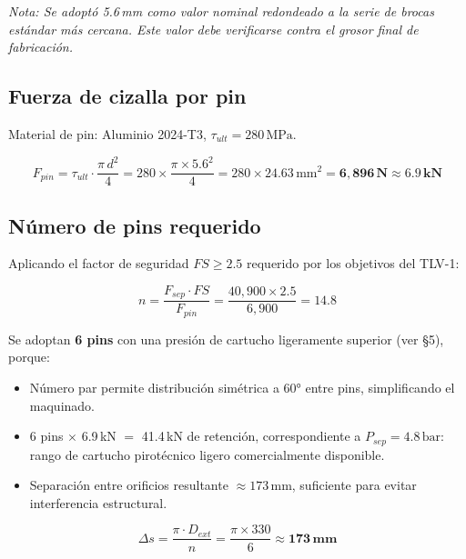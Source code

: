 \documentclass[11pt, a4paper]{article}
\begin{document}
\textit{Nota: Se adoptó 5.6\,mm como valor nominal redondeado a la serie de brocas estándar más cercana. Este valor debe verificarse contra el grosor final de fabricación.}

\subsection{Fuerza de cizalla por pin}

Material de pin: Aluminio 2024-T3, $\tau_{ult} = 280\,\text{MPa}$.

\begin{equation}
  F_{pin} = \tau_{ult} \cdot \frac{\pi \, d^2}{4}
  = 280 \times \frac{\pi \times 5.6^2}{4}
  = 280 \times 24.63\,\text{mm}^2
  = \mathbf{6{,}896\,\text{N} \approx 6.9\,\text{kN}}
\end{equation}

\subsection{Número de pins requerido}

Aplicando el factor de seguridad $FS \geq 2.5$ requerido por los objetivos del TLV-1:

\begin{equation}
  n = \frac{F_{sep} \cdot FS}{F_{pin}} = \frac{40{,}900 \times 2.5}{6{,}900} = 14.8
\end{equation}

Se adoptan \textbf{6 pins} con una presión de cartucho ligeramente superior (ver §5), porque:

\begin{itemize}[leftmargin=*, itemsep=3pt]
  \item Número par permite distribución simétrica a 60° entre pins, simplificando el maquinado.
  \item 6 pins $\times$ 6.9\,kN $=$ 41.4\,kN de retención, correspondiente a $P_{sep} = 4.8\,\text{bar}$: rango de cartucho pirotécnico ligero comercialmente disponible.
  \item Separación entre orificios resultante $\approx 173\,\text{mm}$, suficiente para evitar interferencia estructural.
\end{itemize}

\begin{equation}
  \Delta s = \frac{\pi \cdot D_{ext}}{n} = \frac{\pi \times 330}{6} \approx \mathbf{173\,\text{mm}}
\end{equation}

\end{document}
